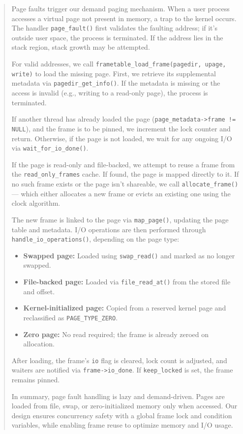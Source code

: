 \documentclass[a4paper,11pt]{paper}
\begin{document}
\begin{quote}
Page faults trigger our demand paging mechanism. When a user process accesses a virtual page not present in memory, a trap to the kernel occurs. The handler \texttt{page\_fault()} first validates the faulting address; if it's outside user space, the process is terminated. If the address lies in the stack region, stack growth may be attempted.

For valid addresses, we call \texttt{frametable\_load\_frame(pagedir, upage, write)} to load the missing page. First, we retrieve its supplemental metadata via \texttt{pagedir\_get\_info()}. If the metadata is missing or the access is invalid (e.g., writing to a read-only page), the process is terminated.

If another thread has already loaded the page (\texttt{page\_metadata->frame != NULL}), and the frame is to be pinned, we increment the lock counter and return. Otherwise, if the page is not loaded, we wait for any ongoing I/O via \texttt{wait\_for\_io\_done()}.

If the page is read-only and file-backed, we attempt to reuse a frame from the \texttt{read\_only\_frames} cache. If found, the page is mapped directly to it. If no such frame exists or the page isn't shareable, we call \texttt{allocate\_frame()} — which either allocates a new frame or evicts an existing one using the clock algorithm.

The new frame is linked to the page via \texttt{map\_page()}, updating the page table and metadata. I/O operations are then performed through \texttt{handle\_io\_operations()}, depending on the page type:
\begin{itemize}
    \item \textbf{Swapped page:} Loaded using \texttt{swap\_read()} and marked as no longer swapped.
    \item \textbf{File-backed page:} Loaded via \texttt{file\_read\_at()} from the stored file and offset.
    \item \textbf{Kernel-initialized page:} Copied from a reserved kernel page and reclassified as \texttt{PAGE\_TYPE\_ZERO}.
    \item \textbf{Zero page:} No read required; the frame is already zeroed on allocation.
\end{itemize}

After loading, the frame’s \texttt{io} flag is cleared, lock count is adjusted, and waiters are notified via \texttt{frame->io\_done}. If \texttt{keep\_locked} is set, the frame remains pinned.

In summary, page fault handling is lazy and demand-driven. Pages are loaded from file, swap, or zero-initialized memory only when accessed. Our design ensures concurrency safety with a global frame lock and condition variables, while enabling frame reuse to optimize memory and I/O usage.

\end{quote}
\end{document}
